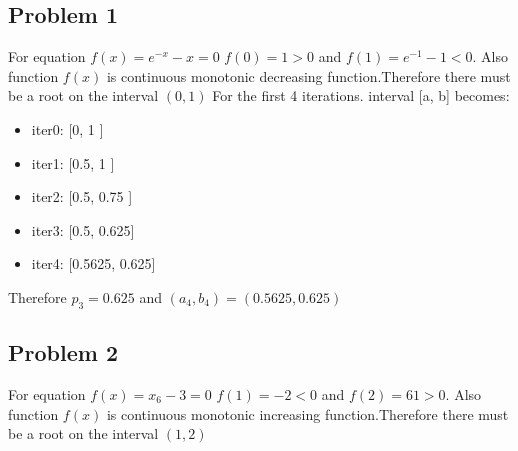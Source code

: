 \documentclass{article}
\begin{document}
 



\hypertarget{problem_0_homework_checklist_2}{}
\subsection*{{Problem 1}}
\label{problem_0_homework_checklist_2}

For equation $f(x) = e^{-x}-x=0 $  \newline
$f(0)=1>0$ and $f(1)=e^{-1}-1<0$.  Also function $f(x)$ is continuous monotonic decreasing function.Therefore there must be a root on the interval $(0,1) $ \newline
For the first 4 iterations.  interval [a, b] becomes: \\
\begin{itemize}
\item iter0: [0,		1	 ]\\
\item iter1: [0.5,	1	 ]\\
\item iter2: [0.5,		0.75	 ]\\
\item iter3: [0.5,		0.625]\\
\item iter4: [0.5625,	0.625]\\
\end{itemize}
Therefore $p_3=0.625$ and $(a_4, b_4)=(0.5625, 0.625) $



\hypertarget{problem_0_homework_checklist_2}{}
\subsection*{{Problem 2}}
\label{problem_0_homework_checklist_2}

For equation $f(x) = x_6-3=0 $  \newline
$f(1)=-2<0$ and $f(2)=61>0$.  Also function $f(x)$ is continuous monotonic increasing function.Therefore there must be a root on the interval $(1,2) $ \newline
\end{document}
